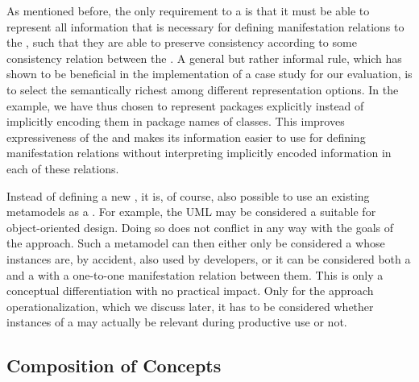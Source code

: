 As mentioned before, the only requirement to a \conceptmetamodel is that it must be able to represent all information that is necessary for defining manifestation relations to the \concretemetamodels, such that they are able to preserve consistency according to some consistency relation between the \concretemetamodels.
A general but rather informal rule, which has shown to be beneficial in the implementation of a case study for our evaluation, is to select the semantically richest among different representation options.
In the example, we have thus chosen to represent packages explicitly instead of implicitly encoding them in package names of classes.
This improves expressiveness of the \conceptmetamodel and makes its information easier to use for defining manifestation relations without interpreting implicitly encoded information in each of these relations.

Instead of defining a new \conceptmetamodel, it is, of course, also possible to use an existing metamodels as a \conceptmetamodel.
For example, the \gls{UML} may be considered a suitable \conceptmetamodel for object-oriented design.
Doing so does not conflict in any way with the goals of the \commonalities approach.
Such a metamodel can then either only be considered a \conceptmetamodel whose instances are, by accident, also used by developers, or it can be considered both a \conceptmetamodel and a \concretemetamodel with a one-to-one manifestation relation between them.
This is only a conceptual differentiation with no practical impact.
Only for the approach operationalization, which we discuss later, it has to be considered whether instances of a \conceptmetamodel may actually be relevant during productive use or not.


\subsection{Composition of Concepts}
\label{chap:improvement:commonalities:composition}

